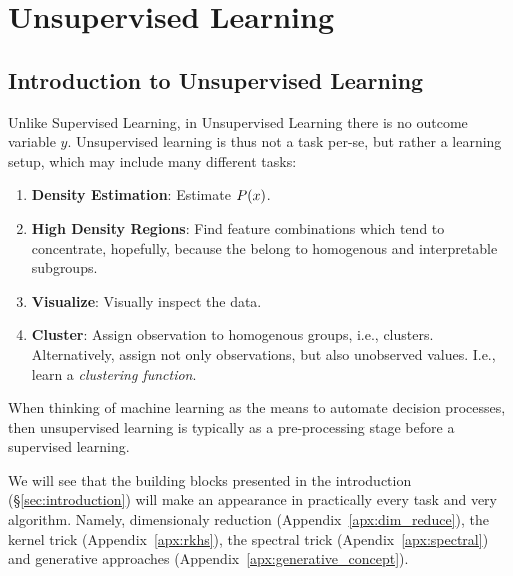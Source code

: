 
\chapter{Unsupervised Learning}

\label{sec:unsupervised}


\section{Introduction to Unsupervised Learning}

Unlike Supervised Learning, in Unsupervised Learning there is no outcome variable $y$.
Unsupervised learning is thus not a task per-se, but rather a learning setup, which may include many different tasks:
\begin{enumerate}
\item \textbf{Density Estimation}: Estimate $P(x)$.

\item \textbf{High Density Regions}: 
Find feature combinations which tend to concentrate, hopefully, because the belong to homogenous and interpretable subgroups.

\item \textbf{Visualize}: 
Visually inspect the data. 

\item \textbf{Cluster}: 
Assign observation to homogenous groups, i.e., clusters.
Alternatively, assign not only observations, but also unobserved values. I.e., learn a \emph{clustering function}.
\end{enumerate}


When thinking of machine learning as the means to automate decision processes, then unsupervised learning is typically as a pre-processing stage before a supervised learning. 

We will see that the building blocks presented in the introduction (\S\ref{sec:introduction}) will make an appearance in practically every task and very algorithm. Namely, dimensionaly reduction (Appendix~\ref{apx:dim_reduce}), the kernel trick (Appendix~\ref{apx:rkhs}), the spectral trick (Apendix~\ref{apx:spectral}) and generative approaches (Appendix~\ref{apx:generative_concept}).






